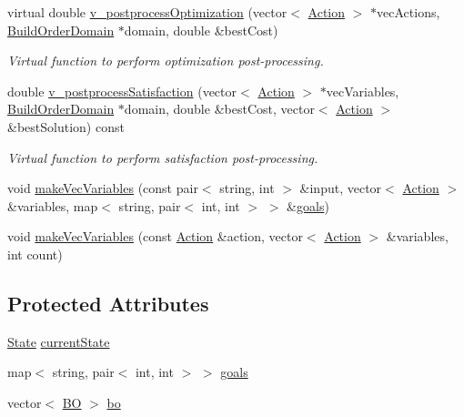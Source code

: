 \begin{DoxyCompactItemize}
virtual double \hyperlink{classghost_1_1BuildOrderObjective_a07306469a8512e33a420d7f8ebab507b}{v\-\_\-postprocess\-Optimization} (vector$<$ \hyperlink{classghost_1_1Action}{Action} $>$ $\ast$vec\-Actions, \hyperlink{classghost_1_1BuildOrderDomain}{Build\-Order\-Domain} $\ast$domain, double \&best\-Cost)
\begin{DoxyCompactList}\small\item\em Virtual function to perform optimization post-\/processing. \end{DoxyCompactList}\item 
double \hyperlink{classghost_1_1BuildOrderObjective_ac33af5d279166ee0ec8d088ca9f03596}{v\-\_\-postprocess\-Satisfaction} (vector$<$ \hyperlink{classghost_1_1Action}{Action} $>$ $\ast$vec\-Variables, \hyperlink{classghost_1_1BuildOrderDomain}{Build\-Order\-Domain} $\ast$domain, double \&best\-Cost, vector$<$ \hyperlink{classghost_1_1Action}{Action} $>$ \&best\-Solution) const 
\begin{DoxyCompactList}\small\item\em Virtual function to perform satisfaction post-\/processing. \end{DoxyCompactList}\item 
void \hyperlink{classghost_1_1BuildOrderObjective_a8f898f213a9fa0b59bd0567fa4617b08}{make\-Vec\-Variables} (const pair$<$ string, int $>$ \&input, vector$<$ \hyperlink{classghost_1_1Action}{Action} $>$ \&variables, map$<$ string, pair$<$ int, int $>$ $>$ \&\hyperlink{classghost_1_1BuildOrderObjective_a714a7fc416d8925bc7d2b9026e9a212c}{goals})
\item 
void \hyperlink{classghost_1_1BuildOrderObjective_ae6bd3128472d66100c1643bbaf095017}{make\-Vec\-Variables} (const \hyperlink{classghost_1_1Action}{Action} \&action, vector$<$ \hyperlink{classghost_1_1Action}{Action} $>$ \&variables, int count)
\end{DoxyCompactItemize}
\subsection*{Protected Attributes}
\begin{DoxyCompactItemize}
\item 
\hyperlink{structghost_1_1BuildOrderObjective_1_1State}{State} \hyperlink{classghost_1_1BuildOrderObjective_acb4b4b2c9dc0e99ab98e61289c62aff8}{current\-State}
\item 
map$<$ string, pair$<$ int, int $>$ $>$ \hyperlink{classghost_1_1BuildOrderObjective_a714a7fc416d8925bc7d2b9026e9a212c}{goals}
\item 
vector$<$ \hyperlink{structghost_1_1BuildOrderObjective_1_1BO}{B\-O} $>$ \hyperlink{classghost_1_1BuildOrderObjective_aa55dce8a8fbdc5fe64ddadfa715e968e}{bo}
\end{DoxyCompactItemize}
